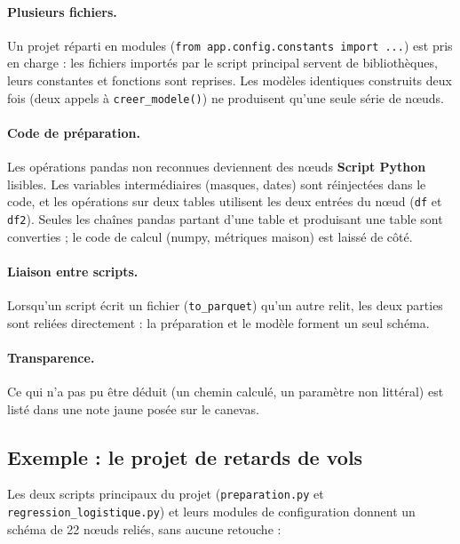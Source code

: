\documentclass[11pt,a4paper]{article}
\newcommand{\code}[1]{\texttt{#1}}
\newcommand{\ui}[1]{\textsf{\textbf{#1}}}   %
\begin{document}
\paragraph{Plusieurs fichiers.} Un projet réparti en modules
(\code{from app.config.constants import ...}) est pris en charge : les fichiers
importés par le script principal servent de bibliothèques, leurs constantes et
fonctions sont reprises. Les modèles identiques construits deux fois (deux appels à
\code{creer\_modele()}) ne produisent qu'une seule série de nœuds.

\paragraph{Code de préparation.} Les opérations pandas non reconnues deviennent des
nœuds \ui{Script Python} lisibles. Les variables intermédiaires (masques, dates) sont
réinjectées dans le code, et les opérations sur deux tables utilisent les deux
entrées du nœud (\code{df} et \code{df2}). Seules les chaînes pandas partant d'une
table et produisant une table sont converties ; le code de calcul (numpy, métriques
maison) est laissé de côté.

\paragraph{Liaison entre scripts.} Lorsqu'un script écrit un fichier
(\code{to\_parquet}) qu'un autre relit, les deux parties sont reliées directement :
la préparation et le modèle forment un seul schéma.

\paragraph{Transparence.} Ce qui n'a pas pu être déduit (un chemin calculé, un
paramètre non littéral) est listé dans une note jaune posée sur le canevas.

\subsection{Exemple : le projet de retards de vols}

Les deux scripts principaux du projet (\code{preparation.py} et
\code{regression\_logistique.py}) et leurs modules de configuration donnent un schéma
de 22 nœuds reliés, sans aucune retouche :
\end{document}
